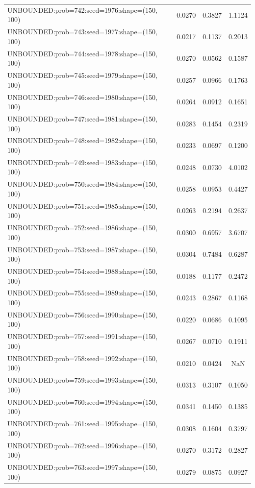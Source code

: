 \begin{longtable}{lccc}
UNBOUNDED:prob=742:seed=1976:shape=(150, 100) &   0.0270 &  0.3827 &  1.1124 \\
UNBOUNDED:prob=743:seed=1977:shape=(150, 100) &   0.0217 &  0.1137 &  0.2013 \\
UNBOUNDED:prob=744:seed=1978:shape=(150, 100) &   0.0270 &  0.0562 &  0.1587 \\
UNBOUNDED:prob=745:seed=1979:shape=(150, 100) &   0.0257 &  0.0966 &  0.1763 \\
UNBOUNDED:prob=746:seed=1980:shape=(150, 100) &   0.0264 &  0.0912 &  0.1651 \\
UNBOUNDED:prob=747:seed=1981:shape=(150, 100) &   0.0283 &  0.1454 &  0.2319 \\
UNBOUNDED:prob=748:seed=1982:shape=(150, 100) &   0.0233 &  0.0697 &  0.1200 \\
UNBOUNDED:prob=749:seed=1983:shape=(150, 100) &   0.0248 &  0.0730 &  4.0102 \\
UNBOUNDED:prob=750:seed=1984:shape=(150, 100) &   0.0258 &  0.0953 &  0.4427 \\
UNBOUNDED:prob=751:seed=1985:shape=(150, 100) &   0.0263 &  0.2194 &  0.2637 \\
UNBOUNDED:prob=752:seed=1986:shape=(150, 100) &   0.0300 &  0.6957 &  3.6707 \\
UNBOUNDED:prob=753:seed=1987:shape=(150, 100) &   0.0304 &  0.7484 &  0.6287 \\
UNBOUNDED:prob=754:seed=1988:shape=(150, 100) &   0.0188 &  0.1177 &  0.2472 \\
UNBOUNDED:prob=755:seed=1989:shape=(150, 100) &   0.0243 &  0.2867 &  0.1168 \\
UNBOUNDED:prob=756:seed=1990:shape=(150, 100) &   0.0220 &  0.0686 &  0.1095 \\
UNBOUNDED:prob=757:seed=1991:shape=(150, 100) &   0.0267 &  0.0710 &  0.1911 \\
UNBOUNDED:prob=758:seed=1992:shape=(150, 100) &   0.0210 &  0.0424 &     NaN \\
UNBOUNDED:prob=759:seed=1993:shape=(150, 100) &   0.0313 &  0.3107 &  0.1050 \\
UNBOUNDED:prob=760:seed=1994:shape=(150, 100) &   0.0341 &  0.1450 &  0.1385 \\
UNBOUNDED:prob=761:seed=1995:shape=(150, 100) &   0.0308 &  0.1604 &  0.3797 \\
UNBOUNDED:prob=762:seed=1996:shape=(150, 100) &   0.0270 &  0.3172 &  0.2827 \\
UNBOUNDED:prob=763:seed=1997:shape=(150, 100) &   0.0279 &  0.0875 &  0.0927 \\

\end{longtable}
